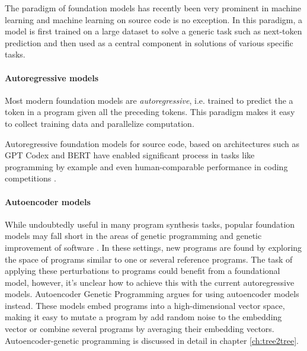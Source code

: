 The paradigm of foundation models \cite{foundation-models} has recently been very prominent in machine learning and machine learning on source code is no exception.
In this paradigm, a model is first trained on a large dataset to solve a generic task such as next-token prediction and then used as a central component in solutions of various specific tasks.

\paragraph{Autoregressive models}

Most modern foundation models are \emph{autoregressive}, i.e. trained to predict the a token in a program given all the preceding tokens.
This paradigm makes it easy to collect training data and parallelize computation.


Autoregressive foundation models for source code, based on architectures such as GPT Codex \cite{radfordImprovingLanguageUnderstanding,chenEvaluatingLargeLanguage2021,codegen,gpt-neo} and BERT \cite{devlinBERTPretrainingDeep2019,codebert} have enabled significant process in tasks like programming by example \cite{halbertProgrammingExample1984} and even human-comparable performance in coding competitions \cite{liCompetitionLevelCodeGeneration2022}.

\paragraph{Autoencoder models}

While undoubtedly useful in many program synthesis tasks, popular foundation models may fall short in the areas of genetic programming \cite{genprogast} and genetic improvement of software \cite{petke2018:genetic}.
In these settings, new programs are found by exploring the space of programs similar to one or several reference programs.
The task of applying these perturbations to programs could benefit from a foundational model, however, it's unclear how to achieve this with the current autoregressive models.
Autoencoder Genetic Programming \cite{autoenc-gp,denoising-autoenc-gp,latentspaceopt} argues for using autoencoder \cite{autoencoders} models instead.
These models embed programs into a high-dimensional vector space, making it easy to mutate a program by add random noise to the embedding vector or combine several programs by averaging their embedding vectors.
Autoencoder-genetic programming is discussed in detail in chapter \ref{ch:tree2tree}.

